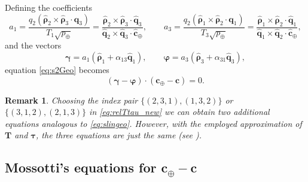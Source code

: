 \documentclass[11pt]{article}
\def\angmom{\bm{c}}
\def\angmom{{\bm{c}}}
\newtheorem{remark}{\bf Remark}
\begin{document}
%
Defining the coefficients
\begin{equation*}
    a_{1} = \frac{q_2\left(\hat{\bm{\rho}}_2\times\hat{\bm{\rho}}_3 \cdot\bm{q}_3\right)}{T_1\sqrt{p_\oplus}}
    = \frac{\hat{\bm{\rho}}_2\times\hat{\bm{\rho}}_3 \cdot\hat{\bm{q}}_3}{\hat{\bm{q}}_2\times\hat{\bm{q}}_3
    \cdot\hat{\bm{c}}_\oplus},
    \qquad
    a_{3} = \frac{q_2\left(\hat{\bm{\rho}}_1\times\hat{\bm{\rho}}_2 \cdot\bm{q}_1\right)}{T_3\sqrt{p_\oplus}}
    = \frac{\hat{\bm{\rho}}_1\times\hat{\bm{\rho}}_2 \cdot\hat{\bm{q}}_1}{\hat{\bm{q}}_1\times\hat{\bm{q}}_2
    \cdot\hat{\bm{c}}_\oplus},
\end{equation*}
%
and the vectors
%
\begin{equation*}
    \bm{\gamma} = a_{1}\left(\hat{\bm{\rho}}_1 + \alpha_{13}\hat{\bm{q}}_1\right),\qquad
    \bm{\varphi} = a_{3}\left(\hat{\bm{\rho}}_3 + \alpha_{31}\hat{\bm{q}}_3\right),
\end{equation*}
equation \eqref{eq:s2Geo} becomes
\begin{equation}
    (\bm{\gamma}-\bm{\varphi})\cdot\left(\bm{c}_\oplus-\bm{c}\right) = 0.
  \label{eq:slingeo}
\end{equation}

\begin{remark}
    Choosing the index pair $\{(2,3,1),(1,3,2)\}$ or $\{(3,1,2),(2,1,3)\}$ in \eqref{eq:relTtau_new} we can obtain two additional equations analogous to \eqref{eq:slingeo}. 
    However, with the employed approximation of $\bm{T}$ and $\bm{\tau}$, the three equations are just the same (see \cite[Sect. 28]{mossotti}).
\end{remark}


\subsection{Mossotti's equations for $\angmom_\oplus-\angmom$}
\label{s:mosseqs}
\end{document}
